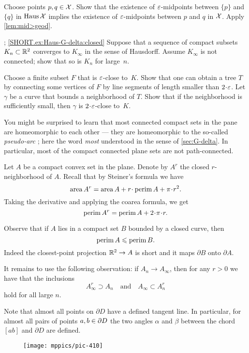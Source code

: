 Choose points $p,q\in\mathcal{X}$. 
Show that the existence of $\varepsilon$-midpoints between $\{p\}$ and $\{q\}$ in $\operatorname{\rm Haus}\nolimits\mathcal{X}$ implies the existence of $\varepsilon$-midpoints between $p$ and $q$ in $\mathcal{X}$.
Apply \ref{lem:mid>geod}.

\parbf{\ref{ex:Haus-G-delta}}; \ref{SHORT.ex:Haus-G-delta:closed}
Suppose that a sequence of compact subsets $K_n\subset \mathbb{R}^2$ converges to $K_\infty$ in the sense of Hausdorff.
Assume $K_\infty$ is not connected; show that so is  $K_n$ for large~$n$.

Choose a finite subset $F$ that is $\varepsilon$-close to~$K$.
Show that one can obtain a tree $T$ by connecting some vertices of $F$ by line segments of length smaller than $2\cdot\eps$.
Let $\gamma$ be a curve that bounds a neighborhood of $T$.
Show that if the neighborhood is sufficiently small, then $\gamma$ is $2\cdot\eps$-close to~$K$.

You might be surprised to learn that most connected compact sets in the pane are homeomorphic to each other --- they are homeomorphic to the so-called \emph{pseudo-arc} \cite{bing-1948}; here the word \textit{most} understood in the sense of \ref{sec:G-delta}.
In particular, most of the compact connected plane sets are not path-connected.


Let $A$ be a compact convex set in the plane.
Denote by $A^r$ the closed $r$-neighborhood of $A$.
Recall that by Steiner's formula we have
\[\area A^r=\area A+r\cdot\perim A+\pi\cdot r^2.\]
Taking the derivative and applying the coarea formula, we get 
\[\perim A^r=\perim A+2\cdot\pi\cdot r.\]

Observe that if $A$ lies in a compact set $B$ bounded by a closed curve, then 
\[\operatorname{\rm perim}\nolimits A\leqslant \operatorname{\rm perim}\nolimits B.\]
Indeed the closest-point projection $\mathbb{R}^2\to A$ is short and it maps $\partial B$ onto $\partial A$.

It remains to use the following observation: if $A_n\to A_\infty$, then for any $r>0$ we have that the inclusions
\[A_\infty^r\supset A_n
\quad\text{and}\quad
A_\infty\subset A_n^r\]
hold for all large $n$.

Note that almost all points on $\partial D$ have a defined tangent line.
In particular, for almost all pairs of points $a,b\z\in\partial D$ the two angles $\alpha$ and $\beta$ between the chord $[ab]$ and $ \partial D$ are defined.

\begin{wrapfigure}{r}{27 mm}
\vskip-3mm
\centering
\texttt{[image: mppics/pic-410]}
\end{wrapfigure}

